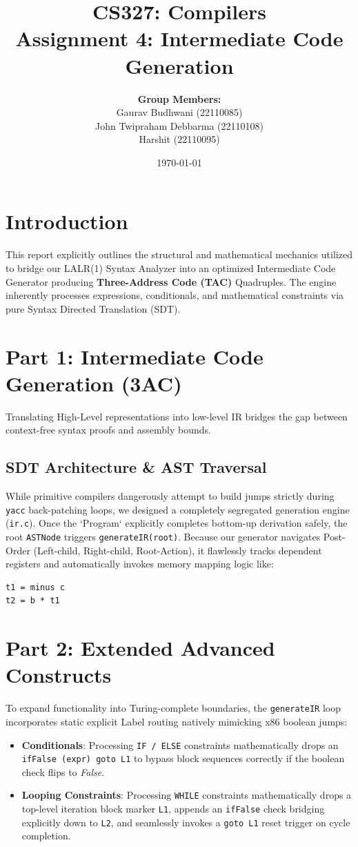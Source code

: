 \documentclass[12pt, a4paper]{article}
\title{\textbf{CS327: Compilers} \\ Assignment 4: Intermediate Code Generation}
\author{
    \textbf{Group Members:} \\
    Gaurav Budhwani (22110085) \\
    John Twipraham Debbarma (22110108) \\
    Harshit (22110095)
}
\date{\today}
\begin{document}
\maketitle
\tableofcontents
\newpage

\section{Introduction}
This report explicitly outlines the structural and mathematical mechanics utilized to bridge our LALR(1) Syntax Analyzer into an optimized Intermediate Code Generator producing \textbf{Three-Address Code (TAC)} Quadruples. The engine inherently processes expressions, conditionals, and mathematical constraints via pure Syntax Directed Translation (SDT).

\section{Part 1: Intermediate Code Generation (3AC)}
Translating High-Level representations into low-level IR bridges the gap between context-free syntax proofs and assembly bounds.
\subsection{SDT Architecture \& AST Traversal}
While primitive compilers dangerously attempt to build jumps strictly during \texttt{yacc} back-patching loops, we designed a completely segregated generation engine (\texttt{ir.c}). Once the `Program` explicitly completes bottom-up derivation safely, the root \texttt{ASTNode} triggers \texttt{generateIR(root)}. 
Because our generator navigates Post-Order (Left-child, Right-child, Root-Action), it flawlessly tracks dependent registers and automatically invokes memory mapping logic like:
\begin{verbatim}
t1 = minus c
t2 = b * t1
\end{verbatim}

\section{Part 2: Extended Advanced Constructs}
To expand functionality into Turing-complete boundaries, the \texttt{generateIR} loop incorporates static explicit Label routing natively mimicking x86 boolean jumps:
\begin{itemize}
    \item \textbf{Conditionals}: Processing \texttt{IF / ELSE} constraints mathematically drops an \texttt{ifFalse (expr) goto L1} to bypass block sequences correctly if the boolean check flips to \textit{False}.
    \item \textbf{Looping Constraints}: Processing \texttt{WHILE} constraints mathematically drops a top-level iteration block marker \texttt{L1}, appends an \texttt{ifFalse} check bridging explicitly down to \texttt{L2}, and seamlessly invokes a \texttt{goto L1} reset trigger on cycle completion.
\end{itemize}
\end{document}
